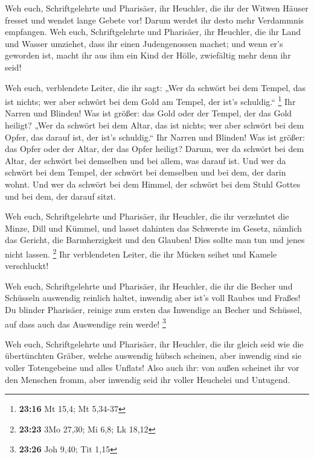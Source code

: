 Weh euch, Schriftgelehrte und Pharisäer, ihr Heuchler,
die ihr der Witwen Häuser fresset und wendet lange Gebete vor! Darum
werdet ihr desto mehr Verdammnis empfangen.  Weh euch,
Schriftgelehrte und Pharisäer, ihr Heuchler, die ihr Land und Wasser
umziehet, dass ihr einen Judengenossen machet; und wenn er's geworden
ist, macht ihr aus ihm ein Kind der Hölle, zwiefältig mehr denn ihr
seid!

 Weh euch, verblendete Leiter, die ihr sagt: „Wer da
schwört bei dem Tempel, das ist nichts; wer aber schwört bei dem Gold am
Tempel, der ist's schuldig.`` \footnote{\textbf{23:16} Mt 15,4; Mt
  5,34-37}  Ihr Narren und Blinden! Was ist größer: das
Gold oder der Tempel, der das Gold heiligt?  „Wer da
schwört bei dem Altar, das ist nichts; wer aber schwört bei dem Opfer,
das darauf ist, der ist's schuldig.``  Ihr Narren und
Blinden! Was ist größer: das Opfer oder der Altar, der das Opfer
heiligt?  Darum, wer da schwört bei dem Altar, der
schwört bei demselben und bei allem, was darauf ist.  Und
wer da schwört bei dem Tempel, der schwört bei demselben und bei dem,
der darin wohnt.  Und wer da schwört bei dem Himmel, der
schwört bei dem Stuhl Gottes und bei dem, der darauf sitzt.

 Weh euch, Schriftgelehrte und Pharisäer, ihr Heuchler,
die ihr verzehntet die Minze, Dill und Kümmel, und lasset dahinten das
Schwerste im Gesetz, nämlich das Gericht, die Barmherzigkeit und den
Glauben! Dies sollte man tun und jenes nicht lassen. \footnote{\textbf{23:23}
  3Mo 27,30; Mi 6,8; Lk 18,12}  Ihr verblendeten Leiter,
die ihr Mücken seihet und Kamele verschluckt!

 Weh euch, Schriftgelehrte und Pharisäer, ihr Heuchler,
die ihr die Becher und Schüsseln auswendig reinlich haltet, inwendig
aber ist's voll Raubes und Fraßes!  Du blinder Pharisäer,
reinige zum ersten das Inwendige an Becher und Schüssel, auf dass auch
das Auswendige rein werde! \footnote{\textbf{23:26} Joh 9,40; Tit 1,15}

 Weh euch, Schriftgelehrte und Pharisäer, ihr Heuchler,
die ihr gleich seid wie die übertünchten Gräber, welche auswendig hübsch
scheinen, aber inwendig sind sie voller Totengebeine und alles Unflats!
 Also auch ihr: von außen scheinet ihr vor den Menschen
fromm, aber inwendig seid ihr voller Heuchelei und Untugend.

